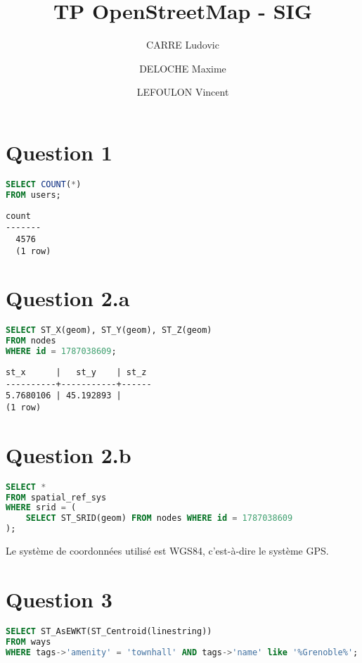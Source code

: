 \documentclass[12pt]{article}
\title{TP OpenStreetMap - SIG}
\author{CARRE Ludovic \and DELOCHE Maxime \and LEFOULON Vincent}
\begin{document}
\maketitle

\section*{Question 1}

\begin{lstlisting}[language=SQL]
SELECT COUNT(*)
FROM users;
\end{lstlisting}

\begin{lstlisting}
count 
-------
  4576
  (1 row)
\end{lstlisting}

\newpage

\section*{Question 2.a}

\begin{lstlisting}[language=SQL]
SELECT ST_X(geom), ST_Y(geom), ST_Z(geom)
FROM nodes
WHERE id = 1787038609;
\end{lstlisting}

\begin{lstlisting}
st_x      |   st_y    | st_z 
----------+-----------+------
5.7680106 | 45.192893 |     
(1 row)
\end{lstlisting}

\section*{Question 2.b}

\begin{lstlisting}[language=SQL]
SELECT *
FROM spatial_ref_sys
WHERE srid = (
    SELECT ST_SRID(geom) FROM nodes WHERE id = 1787038609
);
\end{lstlisting}

Le système de coordonnées utilisé est WGS84, c'est-à-dire le système GPS.

\newpage

\section*{Question 3}

\begin{lstlisting}[language=SQL]
SELECT ST_AsEWKT(ST_Centroid(linestring))
FROM ways
WHERE tags->'amenity' = 'townhall' AND tags->'name' like '%Grenoble%';
\end{lstlisting}
\end{document}
